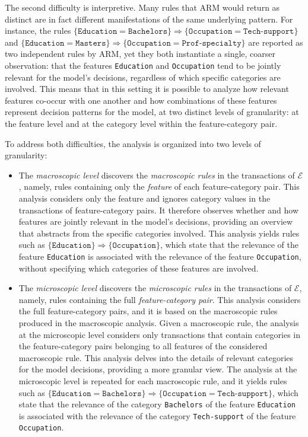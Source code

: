 The second difficulty is interpretive. Many rules that ARM would return as distinct are in fact different manifestations of the same underlying pattern. For instance, the rules $\{\texttt{Education}=\texttt{Bachelors}\} \Rightarrow \{\texttt{Occupation}=\texttt{Tech-support}\}$ and $\{\texttt{Education}=\texttt{Masters}\} \Rightarrow \{\texttt{Occupation}=\texttt{Prof-specialty}\}$ are reported as two independent rules by ARM, yet they both instantiate a single, coarser observation: that the features \texttt{Education} and \texttt{Occupation} tend to be jointly relevant for the model's decisions, regardless of which specific categories are involved. This means that in this setting it is possible to analyze how relevant features co-occur with one another and how combinations of these features represent decision patterns for the model, at two distinct levels of granularity: at the feature level and at the category level within the feature-category pair.

To address both difficulties, the analysis is organized into two levels of granularity:

\begin{itemize}
  \item The \emph{macroscopic level} discovers the \emph{macroscopic rules} in the transactions of $\mathcal{E}$, namely, rules containing only the \emph{feature} of each feature-category pair. This analysis considers only the feature and ignores category values in the transactions of feature-category pairs. It therefore observes whether and how features are jointly relevant in the model's decisions, providing an overview that abstracts from the specific categories involved. This analysis yields rules such as $\{\texttt{Education}\} \Rightarrow \{\texttt{Occupation}\}$, which state that the relevance of the feature \texttt{Education} is associated with the relevance of the feature \texttt{Occupation}, without specifying which categories of these features are involved.
  \item The \emph{microscopic level} discovers the \emph{microscopic rules} in the transactions of $\mathcal{E}$, namely, rules containing the full \emph{feature-category pair}. This analysis considers the full feature-category pairs, and it is based on the macroscopic rules produced in the macroscopic analysis. Given a macroscopic rule, the analysis at the microscopic level considers only transactions that contain categories in the feature-category pairs belonging to all features of the considered macroscopic rule. This analysis delves into the details of relevant categories for the model decisions, providing a more granular view. The analysis at the microscopic level is repeated for each macroscopic rule, and it yields rules such as $\{\texttt{Education}=\texttt{Bachelors}\} \Rightarrow \{\texttt{Occupation}=\texttt{Tech-support}\}$, which state that the relevance of the category \texttt{Bachelors} of the feature \texttt{Education} is associated with the relevance of the category \texttt{Tech-support} of the feature \texttt{Occupation}.
\end{itemize}


